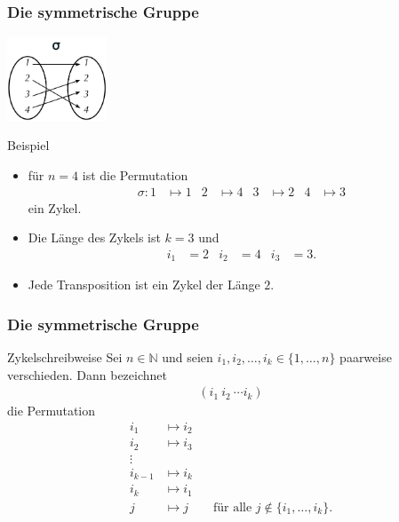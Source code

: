 \documentclass{beamer}
\newcommand\NN{\mathbb N}
\renewcommand{\ae}{\"a}
\newcommand{\ue}{\"u}
\begin{document}
\begin{frame}\frametitle{Die symmetrische Gruppe}
	\hfill\includegraphics[height=25mm]{pics/cycle.pdf}
	\begin{block}{Beispiel}
		\begin{itemize}
			\item f\ue r $n=4$ ist die Permutation 
				\begin{align*}
					\sigma:1&\mapsto1&2&\mapsto4&3&\mapsto2&4&\mapsto3
				\end{align*}
				ein Zykel.
			\item Die L\ae nge des Zykels ist $k=3$ und
				\begin{align*}
					i_1&=2&i_2&=4&i_3&=3.
				\end{align*}
			\item Jede Transposition ist ein Zykel der L\ae nge $2$.
		\end{itemize}
	\end{block}
\end{frame}

\begin{frame}\frametitle{Die symmetrische Gruppe}
	\begin{block}{Zykelschreibweise}
		Sei $n\in\NN$ und seien $i_1,i_2,\ldots,i_k\in\{1,\ldots,n\}$ paarweise verschieden.
		Dann bezeichnet
		\begin{align*}
			(i_1\ i_2\ \cdots i_k)
		\end{align*}
		die Permutation
		\begin{align*}
			i_1&\mapsto i_2\\i_2&\mapsto i_3\\\vdots\\ i_{k-1}&\mapsto i_k\\i_k&\mapsto i_1\\
			j&\mapsto j\qquad\mbox{f\ue r alle }j\not\in\{i_1,\ldots,i_k\}.
		\end{align*}
	\end{block}
\end{frame}
\end{document}
